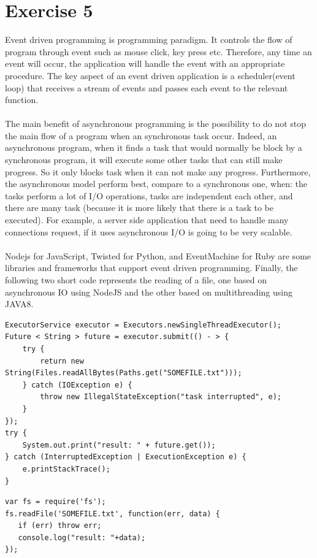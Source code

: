 \documentclass[10pt]{article}
\begin{document}
\section*{Exercise 5}
Event driven programming is programming paradigm. It controls the flow of program through event such as mouse click, key press etc. Therefore, any time an event will occur, the application will handle the event with an appropriate procedure. The key aspect of an event driven application is a scheduler(event loop) that receives a stream of events and passes each event to the relevant function. \\ \\
The main benefit of asynchronous programming is the possibility to do not stop the main flow of a program when an synchronous task occur. Indeed, an asynchronous program, when it finds a task that would normally be block by a synchronous program, it will execute some other tasks that can still make progress. So it only blocks task when it can not make any progress. Furthermore, the asynchronous model perform best, compare to a synchronous one, when: the tasks perform a lot of I/O operations, tasks are independent each other, and there are many task (because it is more likely that there is a task to be executed). For example, a server side application that need to handle many connections request, if it uses asynchronous I/O is going to be very scalable.
\\
\\
Nodejs for JavaScript, Twisted for Python, and EventMachine for Ruby are some libraries and frameworks that support event driven programming. Finally, the following two short code represents the reading of a file, one based on asynchronous IO using NodeJS and the other based on multithreading using JAVA8.
\begin{lstlisting}[caption=multithreading file reader using JAVA8 ]
ExecutorService executor = Executors.newSingleThreadExecutor();
Future < String > future = executor.submit(() - > {
    try {
        return new String(Files.readAllBytes(Paths.get("SOMEFILE.txt")));
    } catch (IOException e) {
        throw new IllegalStateException("task interrupted", e);
    }
});
try {
    System.out.print("result: " + future.get());
} catch (InterruptedException | ExecutionException e) {
    e.printStackTrace();
}
\end{lstlisting}   


\begin{lstlisting}[caption=asynchronous IO file reader using NodeJS ]
var fs = require('fs');
fs.readFile('SOMEFILE.txt', function(err, data) {
   if (err) throw err;
   console.log("result: "+data);
});
\end{lstlisting}   
\end{document}
